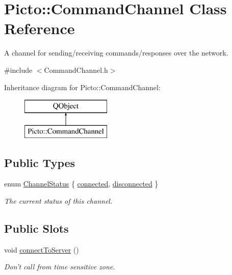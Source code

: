 \hypertarget{class_picto_1_1_command_channel}{\section{Picto\-:\-:Command\-Channel Class Reference}
\label{class_picto_1_1_command_channel}
}


A channel for sending/receiving commands/responses over the network.  




{\ttfamily \#include $<$Command\-Channel.\-h$>$}

Inheritance diagram for Picto\-:\-:Command\-Channel\-:\begin{figure}[H]
\begin{center}
\leavevmode
\includegraphics[height=2.000000cm]{class_picto_1_1_command_channel}
\end{center}
\end{figure}
\subsection*{Public Types}
\begin{DoxyCompactItemize}
\item 
enum \hyperlink{class_picto_1_1_command_channel_ab7d91aac6340369c17e2bd2be8a465db}{Channel\-Status} \{ \hyperlink{class_picto_1_1_command_channel_ab7d91aac6340369c17e2bd2be8a465dbacab8110f599c9fb57e044a328111b2c6}{connected}, 
\hyperlink{class_picto_1_1_command_channel_ab7d91aac6340369c17e2bd2be8a465dbad0e2834ef8ac8d240b15e4f43b4bdc46}{disconnected}
 \}
\begin{DoxyCompactList}\small\item\em The current status of this channel. \end{DoxyCompactList}\end{DoxyCompactItemize}
\subsection*{Public Slots}
\begin{DoxyCompactItemize}
\item 
\hypertarget{class_picto_1_1_command_channel_a58547a1e0081ff7e8aac3ec4d5a4d5fc}{void \hyperlink{class_picto_1_1_command_channel_a58547a1e0081ff7e8aac3ec4d5a4d5fc}{connect\-To\-Server} ()}\label{class_picto_1_1_command_channel_a58547a1e0081ff7e8aac3ec4d5a4d5fc}

\begin{DoxyCompactList}\small\item\em Don't call from time sensitive zone. \end{DoxyCompactList}\end{DoxyCompactItemize}
